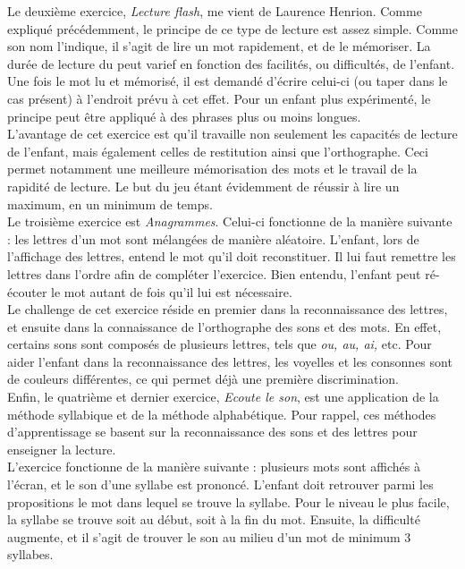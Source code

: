 Le deuxième exercice, \textit{Lecture flash}, me vient de Laurence Henrion. Comme expliqué précédemment, le principe de ce type de lecture est assez simple. Comme son nom l'indique, il s'agit de lire un mot rapidement, et de le mémoriser. La durée de lecture du peut varief en fonction des facilités, ou difficultés, de l'enfant. Une fois le mot lu et mémorisé, il est demandé d'écrire celui-ci (ou taper dans le cas présent) à l'endroit prévu à cet effet. Pour un enfant plus expérimenté, le principe peut être appliqué à des phrases plus ou moins longues.\\

L'avantage de cet exercice est qu'il travaille non seulement les capacités de lecture de l'enfant, mais également celles de restitution ainsi que l'orthographe. Ceci permet notamment une meilleure mémorisation des mots et le travail de la rapidité de lecture. Le but du jeu étant évidemment de réussir à lire un maximum, en un minimum de temps. \\

Le troisième exercice est \textit{Anagrammes}. Celui-ci fonctionne de la manière suivante : les lettres d'un mot sont mélangées de manière aléatoire. L'enfant, lors de l'affichage des lettres, entend le mot qu'il doit reconstituer. Il lui faut remettre les lettres dans l'ordre afin de compléter l'exercice. Bien entendu, l'enfant peut ré-écouter le mot autant de fois qu'il lui est nécessaire.\\

Le challenge de cet exercice réside en premier dans la reconnaissance des lettres, et ensuite dans la connaissance de l'orthographe des sons et des mots. En effet, certains sons sont composés de plusieurs lettres, tels que \textit{ou, au, ai,} etc. Pour aider l'enfant dans la reconnaissance des lettres, les voyelles et les consonnes sont de couleurs différentes, ce qui permet déjà une première discrimination.\\

Enfin, le quatrième et dernier exercice, \textit{Ecoute le son}, est une application de la méthode syllabique et de la méthode alphabétique. Pour rappel, ces méthodes d'apprentissage se basent sur la reconnaissance des sons et des lettres pour enseigner la lecture.\\

L'exercice fonctionne de la manière suivante : plusieurs mots sont affichés à l'écran, et le son d'une syllabe est prononcé. L'enfant doit retrouver parmi les propositions le mot dans lequel se trouve la syllabe. Pour le niveau le plus facile, la syllabe se trouve soit au début, soit à la fin du mot. Ensuite, la difficulté augmente, et il s'agit de trouver le son au milieu d'un mot de minimum 3 syllabes.\\

